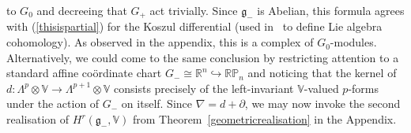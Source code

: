 to $G_0$ and decreeing that $G_+$ act trivially. Since ${\mathfrak{g}}_-$ is
Abelian, this formula agrees with (\ref{thisispartial}) for the Koszul
dif\/ferential (used in~\cite{ce} to def\/ine Lie algebra cohomology). As observed
in the appendix, this is a complex of $G_0$-modules. Alternatively, we could
come to the same conclusion by restricting attention to a standard af\/f\/ine
co\"ordinate chart $G_-\cong{\mathbb{R}}^n\hookrightarrow{\mathbb{RP}}_n$ and
noticing that the kernel of
$d:\Lambda^p\otimes{\mathbb{V}}\to\Lambda^{p+1}\otimes{\mathbb{V}}$ consists
precisely of the left-invariant ${\mathbb{V}}$-valued $p$-forms under the
action of $G_-$ on itself. Since $\nabla=d+\partial$, we may now invoke the
second realisation of $H^r({\mathfrak{g}}_-,{\mathbb{V}})$ from
Theorem~\ref{geometricrealisation} in the Appendix.

